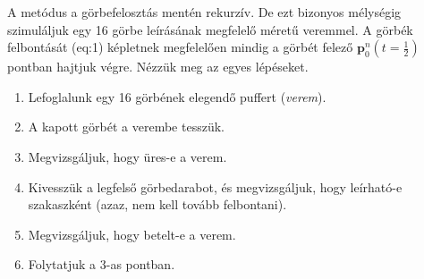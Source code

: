 \documentclass[12pt]{report}
\theoremstyle{definition}
\newcommand{\func}[1]{{\textsl{#1}}}
\begin{document}
A metódus a görbefelosztás mentén rekurzív. De ezt bizonyos mélységig
szimuláljuk egy 16 görbe leírásának megfelelő méretű veremmel. A görbék
felbontását \aref({eq:1}) képletnek megfelelően mindig a görbét felező
$\boldsymbol{p}^n_0(t=\frac{1}{2})$ pontban hajtjuk végre. Nézzük meg az egyes
lépéseket.
  \begin{enumerate}
    \item Lefoglalunk egy 16 görbének elegendő puffert (\emph{verem}).
    \item A kapott görbét a verembe tesszük.
    \item Megvizsgáljuk, hogy üres-e a verem.
    \item Kivesszük a legfelső görbedarabot, és megvizsgáljuk, hogy leírható-e
    szakaszként (azaz, nem kell tovább felbontani).
    \item Megvizsgáljuk, hogy betelt-e a verem.
    \item Folytatjuk a 3-as pontban.
  \end{enumerate}
\end{document}
